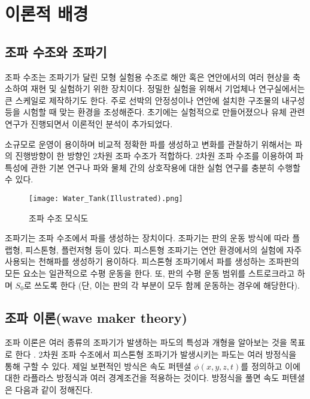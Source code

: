\section{이론적 배경}

\subsection{조파 수조와 조파기}
조파 수조는 조파기가 달린 모형 실험용 수조로 해안 혹은 연안에서의 여러 현상을 축소하여 재현 및 실험하기 위한 장치이다. 정밀한 실험을 위해서 기업체나 연구실에서는 큰 스케일로 제작하기도 한다. 주로 선박의 안정성이나 연안에 설치한 구조물의 내구성 등을 시험할 때 맞는 환경을 조성해준다. 초기에는 실험적으로 만들어졌으나 유체 관련 연구가 진행되면서 이론적인 분석이 추가되었다. 

소규모로 운영이 용이하며 비교적 정확한 파를 생성하고 변화를 관찰하기 위해서는 파의 진행방향이 한 방향인 2차원 조파 수조가 적합하다. 2차원 조파 수조를 이용하여 파 특성에 관한 기본 연구나 파와 물체 간의 상호작용에 대한 실험 연구를 충분히 수행할 수 있다. 

\begin{figure}[htbp]
\begin{center}
\texttt{[image: Water\_Tank(Illustrated).png]}
\end{center}
\caption{조파 수조 모식도}
\label{Fig01}
\end{figure}
조파기는 조파 수조에서 파를 생성하는 장치이다. 조파기는 판의 운동 방식에 따라 플랩형, 피스톤형, 플런저형 등이 있다. 피스톤형 조파기는 연안 환경에서의 실험에 자주 사용되는 천해파를 생성하기 용이하다. 피스톤형 조파기에서 파를 생성하는 조파판의 모든 요소는 일관적으로 수평 운동을 한다. 또, 판의 수평 운동 범위를 스트로크라고 하며 $S_0$로 쓰도록 한다 (단, 이는 판의 각 부분이 모두 함께 운동하는 경우에 해당한다).


\subsection{조파 이론(wave maker theory)}

조파 이론은 여러 종류의 조파기가 발생하는 파도의 특성과 개형을 알아보는 것을 목표로 한다\cite{dean1991water} \cite{zhang2007deterministic} \cite{ojk2018}.
2차원 조파 수조에서 피스톤형 조파기가 발생시키는 파도는 여러 방정식을 통해 구할 수 있다. 제일 보편적인 방식은 속도 퍼텐셜 $\phi(x, y, z, t)$를 정의하고 이에 대한 라플라스 방정식과 여러 경계조건을 적용하는 것이다. 방정식을 풀면 속도 퍼텐셜은 다음과 같이 정해진다.

